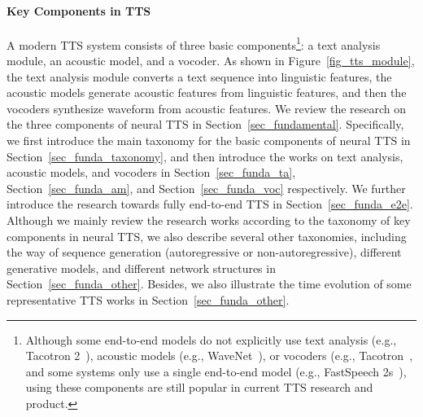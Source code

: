 \documentclass{article}
\begin{document}
\paragraph{Key Components in TTS} A modern TTS system consists of three basic components\footnote{Although some end-to-end models do not explicitly use text analysis (e.g., Tacotron 2~\cite{shen2018natural}), acoustic models (e.g., WaveNet~\cite{oord2016wavenet}), or vocoders (e.g., Tacotron~\cite{wang2017tacotron}, and some systems only use a single end-to-end model (e.g., FastSpeech 2s~\cite{ren2021fastspeech}), using these components are still popular in current TTS research and product.}: a text analysis module, an acoustic model, and a vocoder. As shown in Figure~\ref{fig_tts_module}, the text analysis module converts a text sequence into linguistic features, the acoustic models generate acoustic features from linguistic features, and then the vocoders synthesize waveform from acoustic features. We review the research on the three components of neural TTS in Section~\ref{sec_fundamental}. Specifically, we first introduce the main taxonomy for the basic components of neural TTS in Section~\ref{sec_funda_taxonomy}, and then introduce the works on text analysis, acoustic models, and vocoders in Section~\ref{sec_funda_ta}, Section~\ref{sec_funda_am}, and Section~\ref{sec_funda_voc} respectively. We further introduce the research towards fully end-to-end TTS in Section~\ref{sec_funda_e2e}. Although we mainly review the research works according to the taxonomy of key components in neural TTS, we also describe several other taxonomies, including the way of sequence generation (autoregressive or non-autoregressive), different generative models, and different network structures in Section~\ref{sec_funda_other}. Besides, we also illustrate the time evolution of some representative TTS works in Section~\ref{sec_funda_other}.

\end{document}
